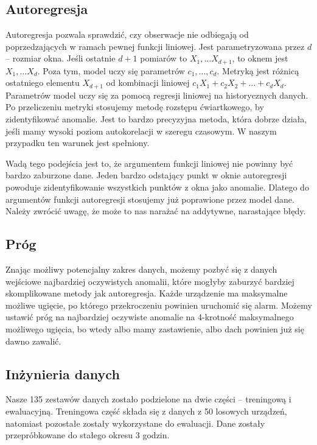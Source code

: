 \subsection{Autoregresja}\label{autoregression}
Autoregresja pozwala sprawdzić, czy obserwacje nie odbiegają od poprzedzających w ramach pewnej funkcji liniowej.
Jest parametryzowana przez $d$ -- rozmiar okna.
Jeśli ostatnie $d + 1$ pomiarów to $X_1, \ldots X_{d + 1}$, to oknem jest $X_1, \ldots X_d$.
Poza tym, model uczy się parametrów $c_1, \ldots, c_d$.
Metryką jest różnicą ostatniego elementu $X_{d+1}$ od kombinacji liniowej $c_1X_1 + c_2X_2 + \ldots + c_dX_d$.
Parametrów model uczy się za pomocą regresji liniowej na historycznych danych.
Po przeliczeniu metryki stosujemy metodę rozstępu ćwiartkowego, by zidentyfikować anomalie.
Jest to bardzo precyzyjna metoda, która dobrze działa, jeśli mamy wysoki poziom autokorelacji w szeregu czasowym.
W naszym przypadku ten warunek jest spełniony.

Wadą tego podejścia jest to, że argumentem funkcji liniowej nie powinny być bardzo zaburzone dane.
Jeden bardzo odstający punkt w oknie autoregresji powoduje zidentyfikowanie wszystkich punktów z okna jako anomalie.
Dlatego do argumentów funkcji autoregresji stosujemy już poprawione przez model dane.
Należy zwrócić uwagę, że może to nas narażać na addytywne, narastające błędy.

\subsection{Próg}\label{threshold}
Znając możliwy potencjalny zakres danych, możemy pozbyć się z danych wejściowe najbardziej oczywistych anomalii, które mogłyby zaburzyć bardziej skomplikowane metody jak autoregresja.
Każde urządzenie ma maksymalne możliwe ugięcie, po którego przekroczeniu powinien uruchomić się alarm.
Możemy ustawić próg na najbardziej oczywiste anomalie na 4-krotność maksymalnego możliwego ugięcia, bo wtedy albo mamy zastawienie, albo dach powinien już się dawno zawalić.

\subsection{Inżynieria danych}\label{subsec:inzynieria-danych}
Nasze 135 zestawów danych zostało podzielone na dwie części -- treningową i ewaluacyjną.
Treningowa część składa się z danych z 50 losowych urządzeń, natomiast pozostałe zostały wykorzystane do ewaluacji.
Dane zostały przepróbkowane do stałego okresu 3 godzin.

